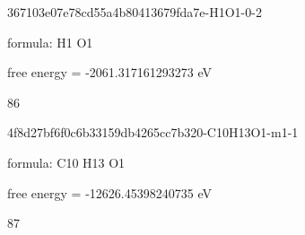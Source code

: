 \documentclass{article}
\begin{document}
367103e07e78cd55a4b80413679fda7e-H1O1-0-2



formula: H1 O1



free energy = -2061.317161293273 eV

86

\vspace{1cm}


4f8d27bf6f0c6b33159db4265cc7b320-C10H13O1-m1-1



formula: C10 H13 O1



free energy = -12626.45398240735 eV

87
\end{document}

